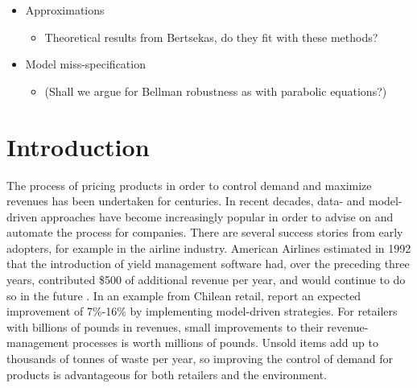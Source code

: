 \documentclass[main.tex]{subfiles}
\begin{document}
\listoftodos

\begin{itemize}
\item Approximations
  \begin{itemize}
  \item Theoretical results from Bertsekas, do they fit with these methods?
  \end{itemize}
\item Model miss-specification
  \begin{itemize}
  \item (Shall we argue for Bellman robustness as with parabolic equations?)
  \end{itemize}
\end{itemize}


\section{Introduction}
The process of pricing products in order to control demand and
maximize revenues has been undertaken for centuries. In recent
decades, data- and model-driven approaches have become increasingly
popular in order to advise on and automate the process for companies.
There are several success stories from early adopters, for example in
the airline industry. American Airlines estimated in 1992 that
the introduction of yield management software had, over the preceding
three years, contributed \$500 of additional revenue per year,
and would continue to do so in the future \citep{smith1992yield}.
In an example from Chilean retail, \citet{bitran1998coordinating}
report an expected improvement of 7\%-16\% by implementing
model-driven strategies.
For retailers with billions of pounds in revenues, small
improvements to their revenue-management processes is worth millions
of pounds.
Unsold items add up to thousands of tonnes of waste per year, so
improving the control of demand for products is advantageous
for both retailers and the environment.
\end{document}
